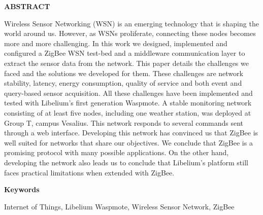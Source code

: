 \centerline{\bf ABSTRACT} \vspace*{0.2em}
\noindent Wireless Sensor Networking (WSN) is an emerging technology that is shaping the world around us. However, as WSNs proliferate, connecting these nodes becomes more and more challenging. 
In this work we designed, implemented and configured a ZigBee WSN test-bed and a middleware communication layer to extract the sensor data from the network. This paper details the challenges we faced and the solutions we developed for them. These challenges are network stability, latency, energy consumption, quality of service and both event and query-based sensor acquisition. All these challenges have been implemented and tested with Libelium's first generation Waspmote. A stable monitoring network consisting of at least five nodes, including one weather station, was deployed at Group T, campus Vesalius. This network responds to several commands sent through a web interface. Developing this network has convinced us that ZigBee is well suited for networks that share our objectives. We conclude that ZigBee is a promising protocol with many possible applications. On the other hand, developing the network also leads us to conclude that Libelium's platform still faces practical limitations when extended with ZigBee. 
\\ \vspace*{2em}

\centerline{\bf Keywords} \vspace*{0.2em}
\noindent
Internet of Things, Libelium Waspmote, Wireless Sensor Network, ZigBee